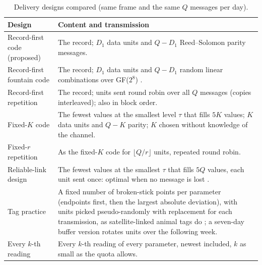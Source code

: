 \begin{table}[t]
\centering
\caption{Delivery designs compared (same frame and the same $Q$ messages per day).}
\label{tab:designs}
\small
\begin{tabularx}{\textwidth}{@{}lX@{}}
\toprule
Design & Content and transmission \\
\midrule
Record-first code (proposed) & The record; $D_1$ data units and $Q - D_1$ Reed--Solomon parity messages. \\
Record-first fountain code & The record; $D_1$ data units and $Q - D_1$ random linear combinations over GF($2^8$) \citep{luby2002,ho2006}. \\
Record-first repetition & The record; units sent round robin over all $Q$ messages (copies interleaved); also in block order. \\
Fixed-$K$ code & The fewest values at the smallest level $\tau$ that fills $5K$ values; $K$ data units and $Q - K$ parity; $K$ chosen without knowledge of the channel. \\
Fixed-$r$ repetition & As the fixed-$K$ code for $\lfloor Q / r \rfloor$ units, repeated round robin. \\
Reliable-link design & The fewest values at the smallest $\tau$ that fills $5Q$ values, each unit sent once: optimal when no message is lost \citep{deligiannakis2007}. \\
Tag practice & A fixed number of broken-stick points per parameter (endpoints first, then the largest absolute deviation), with units picked pseudo-randomly with replacement for each transmission, as satellite-linked animal tags do \citep{boehme2009,photopoulou2015}; a seven-day buffer version rotates units over the following week. \\
Every $k$-th reading & Every $k$-th reading of every parameter, newest included, $k$ as small as the quota allows. \\
\bottomrule
\end{tabularx}
\end{table}

